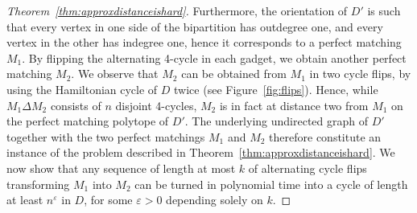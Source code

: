 \documentclass[runningheads]{llncs}
\begin{document}
\begin{proof}[Theorem~\ref{thm:approxdistanceishard}]
  Furthermore, the orientation of $D'$ is such that every vertex in one side of the bipartition has outdegree one, and every vertex in the other has indegree one, hence it corresponds to a perfect matching $M_1$.
  By flipping the alternating 4-cycle in each gadget, we obtain another perfect matching $M_2$.
  We observe that $M_2$ can be obtained from $M_1$ in two cycle flips, by using the Hamiltonian cycle of $D$ twice (see Figure~\ref{fig:flips}). Hence, while $M_1\Delta M_2$ consists of $n$ disjoint 4-cycles, $M_2$ is in fact at distance two from $M_1$ on the perfect matching polytope of $D'$.
  The underlying undirected graph of $D'$ together with the two perfect matchings $M_1$ and $M_2$ therefore constitute an instance of the problem described in Theorem~\ref{thm:approxdistanceishard}.
  We now show that any sequence of length at most $k$ of alternating cycle flips transforming $M_1$ into $M_2$ can be turned in polynomial time into a cycle of length at least $n^{\varepsilon}$ in $D$, for some $\varepsilon>0$ depending solely on $k$.


\end{proof}
\end{document}
